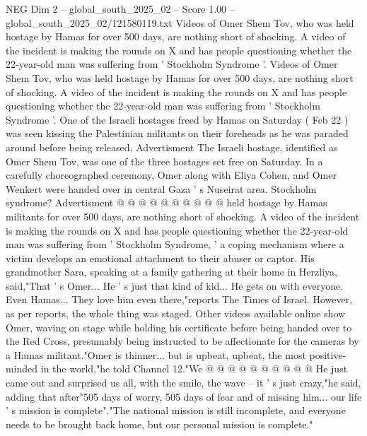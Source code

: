 \begin{textsample}{NEG Dim 2 – global\_south\_2025\_02 – Score 1.00 – global\_south\_2025\_02/121580119.txt}  \label{ex:f2_neg_071}
Videos of Omer Shem Tov, who was held hostage by Hamas for over 500 days, are nothing short of shocking.
A video of the incident is making the rounds on X and has people questioning whether the 22-year-old man was suffering from ' Stockholm Syndrome '.
Videos of Omer Shem Tov, who was held hostage by Hamas for over 500 days, are nothing short of shocking.
A video of the incident is making the rounds on X and has people questioning whether the 22-year-old man was suffering from ' Stockholm Syndrome '.
One of the Israeli hostages freed by Hamas on Saturday ( Feb 22 ) was seen kissing the Palestinian militants on their foreheads as he was paraded around before being released.
Advertisment The Israeli hostage, identified as Omer Shem Tov, was one of the three hostages set free on Saturday.
In a carefully choreographed ceremony, Omer along with Eliya Cohen, and Omer Wenkert were handed over in central Gaza ' s Nuseirat area.
Stockholm syndrome?
Advertisment @ @ @ @ @ @ @ @ @ @ held hostage by Hamas militants for over 500 days, are nothing short of shocking.
A video of the incident is making the rounds on X and has people questioning whether the 22-year-old man was suffering from ' Stockholm Syndrome, ' a coping mechanism where a victim develops an emotional attachment to their abuser or captor.
His grandmother Sara, speaking at a family gathering at their home in Herzliya, said,"That ' s Omer...
He ' s just that kind of kid...
He gets on with everyone.
Even Hamas...
They love him even there,"reports The Times of Israel.
However, as per reports, the whole thing was staged.
Other videos available online show Omer, waving on stage while holding his certificate before being handed over to the Red Cross, presumably being instructed to be affectionate for the cameras by a Hamas militant."Omer is thinner... but is upbeat, upbeat, the most positive-minded in the world,"he told Channel 12."We @ @ @ @ @ @ @ @ @ @ He just came out and surprised us all, with the smile, the wave -- it ' s just crazy,"he said, adding that after"505 days of worry, 505 days of fear and of missing him... our life ' s mission is complete"."The national mission is still incomplete, and everyone needs to be brought back home, but our personal mission is complete."

\end{textsample}
